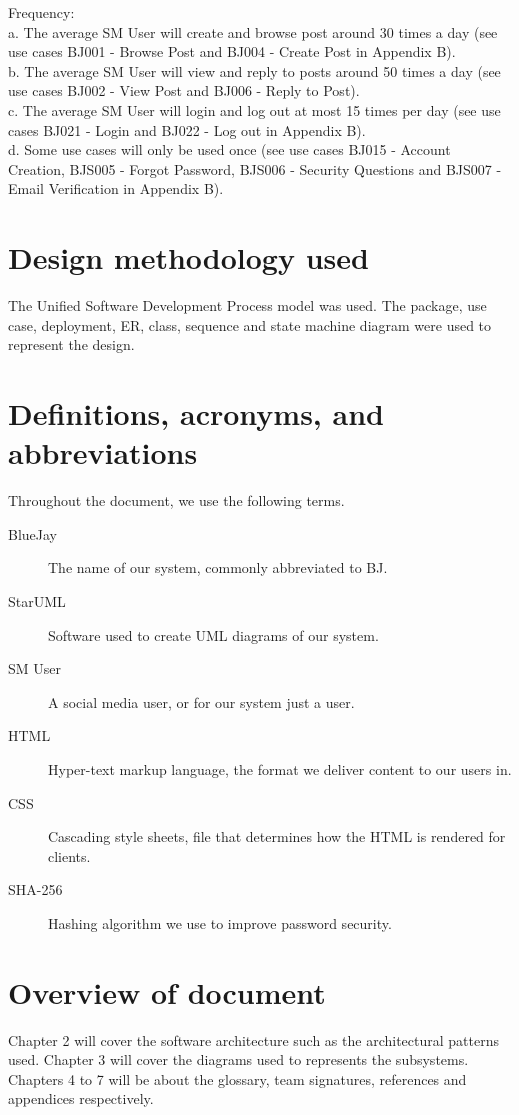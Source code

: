 \documentclass{report}
\begin{document}
	Frequency:\\
		a.	The average SM User will create and browse post around 30 times a day (see use cases BJ001 - Browse Post and BJ004 - Create Post in Appendix B).\\
		b.	The average SM User will view and reply to posts around 50 times a day (see use cases BJ002 - View Post and BJ006 - Reply to Post).\\
		c.	The average SM User will login and log out at most 15 times per day (see use cases BJ021 - Login and BJ022 - Log out in Appendix B).\\
		d.	Some use cases will only be used once (see use cases BJ015 - Account Creation, BJS005 - Forgot Password, BJS006 - Security Questions and BJS007 - Email Verification in Appendix B).\\
\section{Design methodology used} 
	The Unified Software Development Process model was used.
	The package, use case, deployment, ER, class, sequence and state machine diagram were used to represent the design.


\section{Definitions, acronyms, and abbreviations}
	Throughout the document, we use the following terms.
	\begin{description}
		\item [BlueJay] The name of our system, commonly abbreviated to BJ.
		\item [StarUML] Software used to create UML diagrams of our system.
		\item [SM User] A social media user, or for our system just a user.
		\item [HTML] Hyper-text markup language, the format we deliver content to our users in.
		\item [CSS] Cascading style sheets, file that determines how the HTML is rendered for clients.
		\item [SHA-256] Hashing algorithm we use to improve password security.
	\end{description}
\section{Overview of document}
	Chapter 2 will cover the software architecture such as the architectural patterns used.
	Chapter 3 will cover the diagrams used to represents the subsystems.
	Chapters 4 to 7 will be about the glossary, team signatures, references and appendices respectively.
\end{document}

